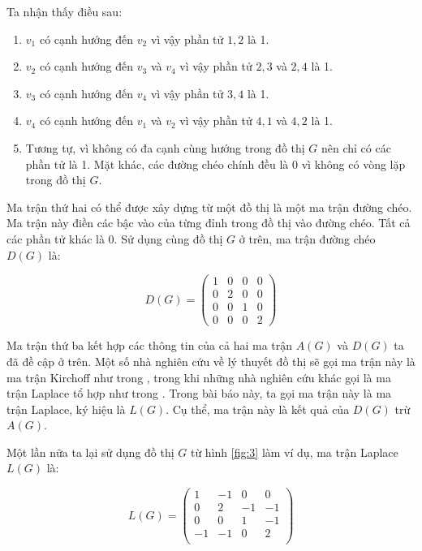 \documentclass[14pt, a4paper]{article}
\numberwithin{equation}{section}
\numberwithin{figure}{section}
\numberwithin{dl}{section}
\numberwithin{md}{section}
\numberwithin{bd}{section}
\numberwithin{dn}{section}
\numberwithin{hq}{section}
\begin{document}
    Ta nhận thấy điều sau:

    \begin{enumerate}[label=(\alph*)]
        \item $v_1$ có cạnh hướng đến $v_2$ vì vậy phần tử $1, 2$ là 1.
        \item $v_2$ có cạnh hướng đến $v_3$ và $v_4$ vì vậy phần tử $2, 3$ và $2, 4$ là 1.
        \item $v_3$ có cạnh hướng đến $v_4$ vì vậy phần tử $3, 4$ là 1.
        \item $v_4$ có cạnh hướng đến $v_1$ và $v_2$ vì vậy phần tử $4,1$ và $4, 2$ là 1.
        \item Tương tự, vì không có đa cạnh cùng hướng trong đồ thị $G$ nên chỉ có các phần tử là 1. Mặt khác, các đường chéo chính đều là 0 vì không có vòng lặp trong đồ thị $G$.
    \end{enumerate}

    Ma trận thứ hai có thể được xây dựng từ một đồ thị là một ma trận đường chéo.
    Ma trận này điền các bậc vào của từng đỉnh trong đồ thị vào đường chéo.
    Tất cả các phần tử khác là 0.
    Sử dụng cùng đồ thị $G$ ở trên, ma trận đường chéo $D(G)$ là:

    \begin{equation*}
        D(G) = \begin{pmatrix}
            1 & 0 & 0 & 0 \\
            0 & 2 & 0 & 0 \\
            0 & 0 & 1 & 0 \\
            0 & 0 & 0 & 2
        \end{pmatrix}
    \end{equation*} 

    Ma trận thứ ba kết hợp các thông tin của cả hai ma trận $A(G)$ và $D(G)$ ta đã đề cập ở trên.
    Một số nhà nghiên cứu về lý thuyết đồ thị sẽ gọi ma trận này là ma trận Kirchoff như trong \cite{fleischner1990eulerian}, trong khi những nhà nghiên cứu khác gọi là ma trận Laplace tổ hợp như trong \cite{bollobas1998graduate}.
    Trong bài báo này, ta gọi ma trận này là ma trận Laplace, ký hiệu là $L(G)$.
    Cụ thể, ma trận này là kết quả của $D(G)$ trừ $A(G)$.

    Một lần nữa ta lại sử dụng đồ thị $G$ từ hình \ref{fig:3} làm ví dụ, ma trận Laplace $L(G)$ là:

    \begin{equation*}
        L(G) = \begin{pmatrix}
            1 & -1 & 0 & 0 \\
            0 & 2 & -1 & -1 \\
            0 & 0 & 1 & -1 \\
            -1 & -1 & 0 & 2 \\
        \end{pmatrix}
    \end{equation*}
\end{document}
